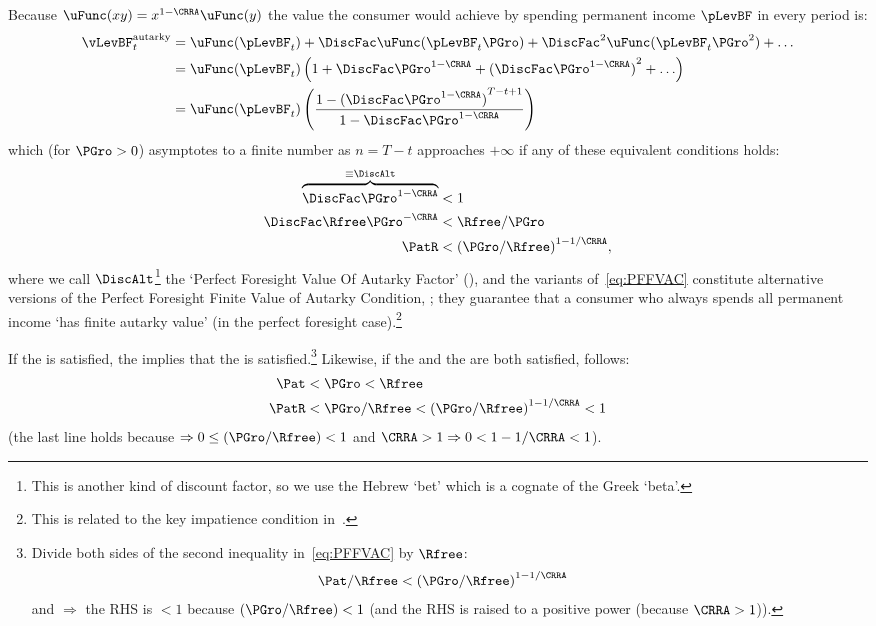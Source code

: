 \documentclass[ProjectDLO]{subfiles}
\begin{document}
Because $\uFunc(xy) = x^{1-\CRRA}\uFunc(y)$ the value the consumer would achieve by spending permanent income $\pLevBF$ in every period is:
\begin{align}
  \vLevBF_{t}^{\text{autarky}}  & = \uFunc(\pLevBF_{t})+\DiscFac \uFunc(\pLevBF_{t}\PGro)+\DiscFac^{2} \uFunc(\pLevBF_{t} \PGro^{2})+\ldots \label{eq:ValuePFAnalyticalAutarky}
  \\  & = \uFunc(\pLevBF_{t})\left(1+\DiscFac \PGro^{1-\CRRA}+{(\DiscFac \PGro^{1-\CRRA})}^{2}+\ldots\right) \notag
  \\  & = \uFunc(\pLevBF_{t})\left(\frac{1-{(\DiscFac \PGro^{1-\CRRA})}^{T-t+1}}{1-\DiscFac \PGro^{1-\CRRA}}\right) \notag
\end{align}
which (for $\PGro>0$) asymptotes to a finite number as $n=T-t$ approaches $+\infty$ if any of these equivalent conditions holds:
\begin{align}
  \overbrace{\DiscFac \PGro^{1-\CRRA} }^{\equiv \DiscAlt}  & < 1  \nonumber
  \\ \DiscFac \Rfree \PGro^{-\CRRA}  & < \Rfree/\PGro \label{eq:PFFVAC}
  \\ \PatR    & < {(\PGro/\Rfree)}^{1-1/\CRRA},  \nonumber
\end{align}
where we call $\DiscAlt$\footnote{This is another kind of discount factor, so we use the Hebrew `bet' which is a cognate of the Greek `beta'.} the `Perfect Foresight Value Of Autarky Factor' ({\PFVAF}), and the variants of~\eqref{eq:PFFVAC} constitute alternative versions of the Perfect Foresight Finite Value of Autarky Condition, \PFFVAC; they guarantee that a consumer who always spends all permanent income `has finite autarky value'  (in the perfect foresight case).\footnote{This is related to the key impatience condition in~\cite{asHomogeneous}.} %

If the {\FHWC} is satisfied, the {\PFFVAC} implies that the {\RIC} is satisfied.\footnote{Divide both sides of the second inequality in~\eqref{eq:PFFVAC} by $\Rfree$:
\begin{align}
   \Pat/\Rfree & < {(\PGro/\Rfree)}^{1-1/\CRRA}  \label{eq:FHWCandPFFVACimplyRIC}
\end{align}
and {\FHWC} $\Rightarrow$ the RHS is $< 1$ because $(\PGro/\Rfree) < 1$ (and the RHS is raised to a positive power (because $\CRRA>1$)).}  Likewise, if the {\FHWC} and the {\GIC} are both satisfied, {\PFFVAC} follows:
\begin{align}
 \Pat & < \PGro < \Rfree \notag
\\   \PatR & < \PGro/\Rfree < {(\PGro/\Rfree)}^{1-1/\CRRA} < 1\label{eq:GICandFHWCimplyPFFVAC}
\end{align}
(the last line holds because {\FHWC} $\Rightarrow 0 \leq (\PGro/\Rfree) < 1$ and $\CRRA > 1 \Rightarrow 0 < 1-1/\CRRA < 1$).
\end{document}
